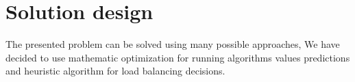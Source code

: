 \chapter{Solution design}\label{ch:solution-design}
The presented problem can be solved using many possible approaches,
We have decided to use mathematic optimization for running algorithms values predictions
and heuristic algorithm for load balancing decisions.



\newpage


